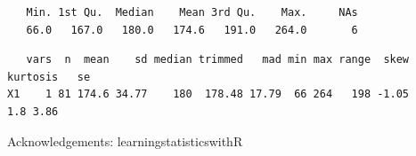 \documentclass[
  letterpaper,
  DIV=11,
  numbers=noendperiod]{scrartcl}
\newenvironment{Shaded}{\begin{snugshade}}{\end{snugshade}}
\newcommand{\FunctionTok}[1]{\textcolor[rgb]{0.28,0.35,0.67}{#1}}
\newcommand{\NormalTok}[1]{\textcolor[rgb]{0.00,0.23,0.31}{#1}}
\newcommand{\SpecialCharTok}[1]{\textcolor[rgb]{0.37,0.37,0.37}{#1}}
\begin{document}
\begin{verbatim}
   Min. 1st Qu.  Median    Mean 3rd Qu.    Max.     NAs 
   66.0   167.0   180.0   174.6   191.0   264.0       6 
\end{verbatim}

\begin{Shaded}
\end{Shaded}

\begin{verbatim}
   vars  n  mean    sd median trimmed   mad min max range  skew kurtosis   se
X1    1 81 174.6 34.77    180  178.48 17.79  66 264   198 -1.05      1.8 3.86
\end{verbatim}

Acknowledgements: learningstatisticswithR
\end{document}
